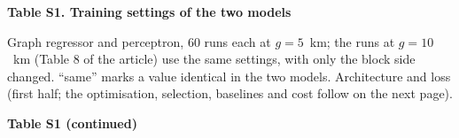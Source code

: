 \documentclass[10pt,a4paper]{article}
\begin{document}
{\large\bfseries Table S1. Training settings of the two models}

\medskip
\small
Graph regressor and perceptron, 60 runs each at $g = 5$~km; the runs at $g = 10$~km (Table 8 of the article) use the same settings, with only the block side changed. ``same'' marks a value identical in the two models.
Architecture and loss (first half; the optimisation, selection, baselines and cost follow on the next page).

\medskip


\clearpage
{\large\bfseries Table S1 (continued)}

\medskip
\small

\end{document}
